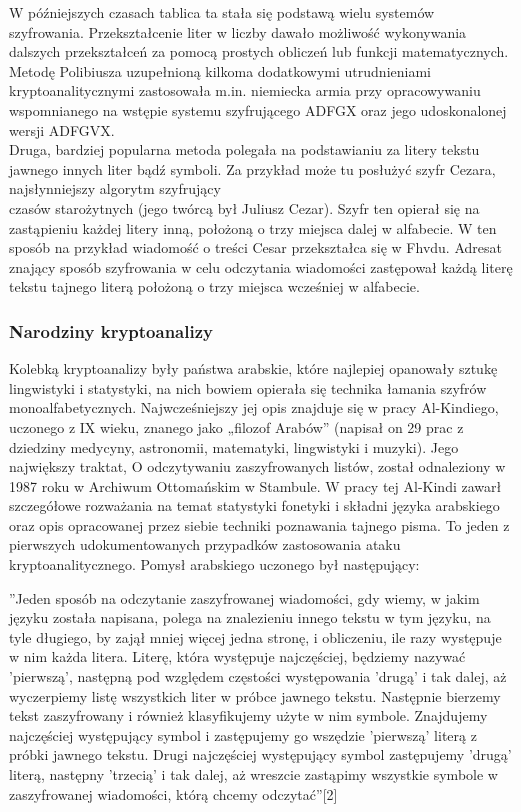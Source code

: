 \documentclass[a4paper]{article}
\begin{document}
\noindent W późniejszych czasach tablica ta stała się podstawą wielu systemów szyfrowania. Przekształcenie
liter w liczby dawało możliwość wykonywania dalszych przekształceń za pomocą prostych obliczeń
lub funkcji matematycznych. Metodę Polibiusza uzupełnioną kilkoma dodatkowymi utrudnieniami
kryptoanalitycznymi zastosowała m.in. niemiecka armia przy opracowywaniu wspomnianego na
wstępie systemu szyfrującego ADFGX oraz jego udoskonalonej wersji ADFGVX.\\
Druga, bardziej popularna metoda polegała na podstawianiu za litery tekstu jawnego innych liter
bądź symboli. Za przykład może tu posłużyć szyfr Cezara, najsłynniejszy algorytm szyfrujący\\

\noindent czasów starożytnych (jego twórcą był Juliusz Cezar). Szyfr ten opierał się na zastąpieniu każdej
litery inną, położoną o trzy miejsca dalej w alfabecie. W ten sposób na przykład wiadomość o treści
Cesar przekształca się w Fhvdu. Adresat znający sposób szyfrowania w celu odczytania wiadomości
zastępował każdą literę tekstu tajnego literą położoną o trzy miejsca wcześniej w alfabecie.
\subsubsection{Narodziny kryptoanalizy}
Kolebką kryptoanalizy były państwa arabskie, które najlepiej opanowały sztukę lingwistyki i statystyki, na nich bowiem opierała się technika łamania szyfrów monoalfabetycznych. Najwcześniejszy
jej opis znajduje się w pracy Al-Kindiego, uczonego z IX wieku, znanego jako „filozof Arabów”
(napisał on 29 prac z dziedziny medycyny, astronomii, matematyki, lingwistyki i muzyki). Jego
największy traktat, O odczytywaniu zaszyfrowanych listów, został odnaleziony w 1987 roku w Archiwum Ottomańskim w Stambule. W pracy tej Al-Kindi zawarł szczegółowe rozważania na temat
statystyki fonetyki i składni języka arabskiego oraz opis opracowanej przez siebie techniki poznawania tajnego pisma. To jeden z pierwszych udokumentowanych przypadków zastosowania ataku
kryptoanalitycznego. Pomysł arabskiego uczonego był następujący:
\begin{center}
”Jeden sposób na odczytanie zaszyfrowanej wiadomości, gdy wiemy, w jakim języku została
napisana, polega na znalezieniu innego tekstu w tym języku, na tyle długiego, by zajął mniej
więcej jedna stronę, i obliczeniu, ile razy występuje w nim każda litera. Literę, która występuje
najczęściej, będziemy nazywać ’pierwszą’, następną pod względem częstości występowania ’drugą’
i tak dalej, aż wyczerpiemy listę wszystkich liter w próbce jawnego tekstu. Następnie bierzemy
tekst zaszyfrowany i również klasyfikujemy użyte w nim symbole. Znajdujemy najczęściej
występujący symbol i zastępujemy go wszędzie ’pierwszą’ literą z próbki jawnego tekstu. Drugi
najczęściej występujący symbol zastępujemy ’drugą’ literą, następny ’trzecią’ i tak dalej, aż
wreszcie zastąpimy wszystkie symbole w zaszyfrowanej wiadomości, którą chcemy odczytać”[2]
\end{center}
\end{document}
